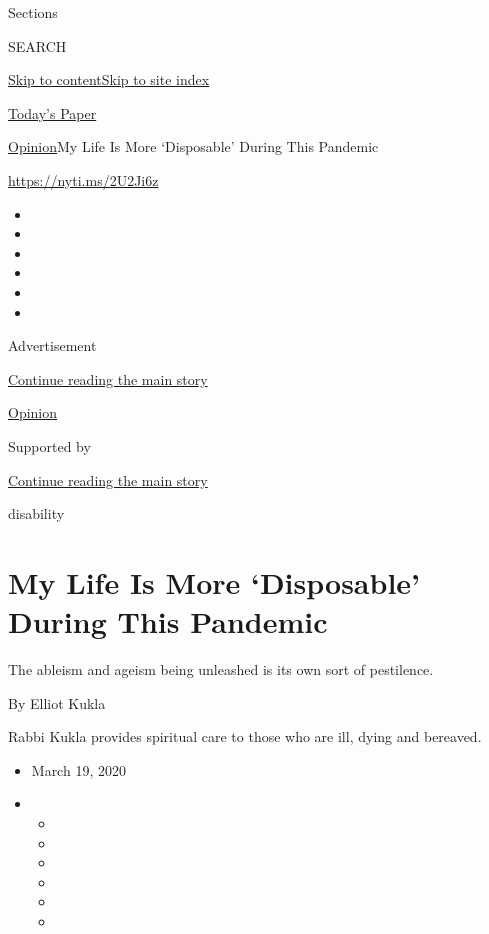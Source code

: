 Sections

SEARCH

\protect\hyperlink{site-content}{Skip to
content}\protect\hyperlink{site-index}{Skip to site index}

\href{https://myaccount.nytimes.com/auth/login?response_type=cookie\&client_id=vi}{}

\href{https://www.nytimes.com/section/todayspaper}{Today's Paper}

\href{/section/opinion}{Opinion}\textbar{}My Life Is More `Disposable'
During This Pandemic

\href{https://nyti.ms/2U2Ji6z}{https://nyti.ms/2U2Ji6z}

\begin{itemize}
\item
\item
\item
\item
\item
\item
\end{itemize}

Advertisement

\protect\hyperlink{after-top}{Continue reading the main story}

\href{/section/opinion}{Opinion}

Supported by

\protect\hyperlink{after-sponsor}{Continue reading the main story}

disability

\hypertarget{my-life-is-more-disposable-during-this-pandemic}{%
\section{My Life Is More `Disposable' During This
Pandemic}\label{my-life-is-more-disposable-during-this-pandemic}}

The ableism and ageism being unleashed is its own sort of pestilence.

By Elliot Kukla

Rabbi Kukla provides spiritual care to those who are ill, dying and
bereaved.

\begin{itemize}
\item
  March 19, 2020
\item
  \begin{itemize}
  \item
  \item
  \item
  \item
  \item
  \item
  \end{itemize}
\end{itemize}

